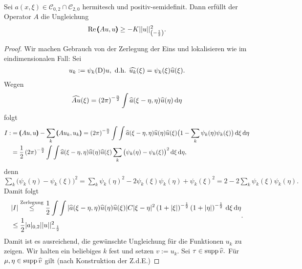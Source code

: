 \begin{thm}
Sei $a(x,\xi)\in\mathcal{C}_{0,2}\cap\mathcal{C}_{2,0}$ hermitesch und positiv-semidefinit. Dann erfüllt der Operator $A$ die Ungleichung
\begin{align}
	\operatorname{Re} \pmb(Au,u\pmb) \ge - K|| u||_{\left(-\frac{1}{2}\right)}^2.
\end{align}

\end{thm}
\begin{proof}
	Wir machen Gebrauch von der Zerlegung der Eins und lokalisieren wie im eindimensionalen Fall: Sei
	\begin{align}
		u_k:= \psi_k(\mathrm D)u, \text{ d.h. } \widehat{u_k}(\xi) = \psi_k(\xi) \widehat{u}(\xi).
\end{align}
Wegen 
\begin{align}
	\widehat{Au}(\xi) = \left(2\pi\right)^{-\frac{n}{2}}\int \widehat{a}(\xi-\eta,\eta)\widehat{u}(\eta)\,\mathrm d \eta
\end{align}	 
folgt
\begin{align}
	\begin{split} I:&=\pmb(Au,u\pmb)-\sum\limits_k \pmb(Au_k,u_k\pmb) = \left(2\pi\right)^{-\frac{n}{2}}\int\int \widehat{a}(\xi-\eta,\eta)\widehat{u}(\eta)\widehat{u}(\xi)\big(1-\sum\limits_k \psi_k(\eta)\psi_k(\xi)\big)\,\mathrm d \xi\,\mathrm d\eta\\
	&= \frac{1}{2}\left(2\pi\right)^{-\frac{n}{2}} \int\int \widehat{a}(\xi-\eta,\eta)\widehat{u}(\eta)\widehat{u}(\xi)\sum\limits_k\big(\psi_k(\eta)-\psi_k(\xi)\big)^2\,\mathrm d \xi\,\mathrm d\eta,
\end{split}
\end{align}
denn $\sum\limits_k\big(\psi_k(\eta)-\psi_k(\xi)\big)^2=\sum\limits_k\psi_k(\eta)^2-2\psi_k(\xi)\psi_k(\eta)+\psi_k(\xi)^2=2-2\sum\limits_k\psi_k(\xi)\psi_k(\eta).$
Damit folgt
\begin{align}
\begin{split}	&| I| \overset{\text{Zerlegung}}{\le}\frac{1}{2}\int\int|\widehat{a}(\xi-\eta,\eta)\widehat{u}(\eta)\widehat{u}(\xi)| C |\xi-\eta|^2\left(1+| \xi|\right)^{-\frac{1}{2}} \left(1+| \eta|\right)^{-\frac{1}{2}}\,\mathrm d \xi \,\mathrm d \eta\\ 
& \le \frac{1}{2}| a|_{0,2}|| u||_{-\frac{1}{2}}^2
\end{split}.
\end{align}
Damit ist es ausreichend, die gewünschte Ungleichung für die Funktionen $u_k$ zu zeigen. Wir halten ein beliebiges $k$ fest und setzen $v:= u_k.$ Sei $\tau\in \operatorname{supp} \widehat{v}.$ Für $\mu, \eta \in \operatorname{supp} \widehat{v}$ gilt (nach Konstruktion der Z.d.E.)

\end{proof}
